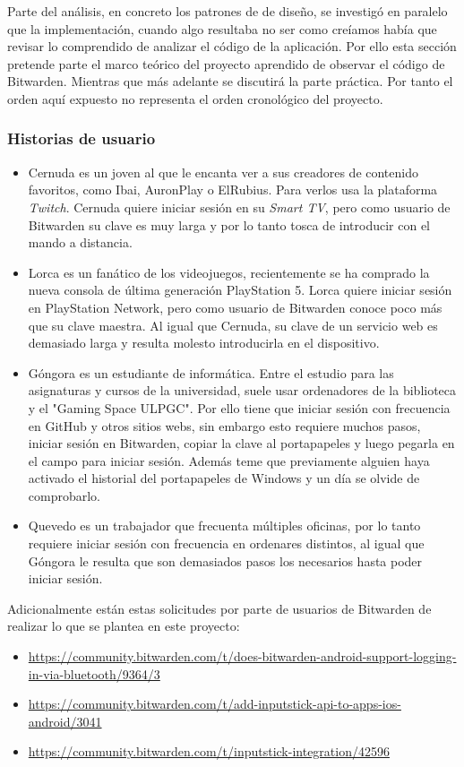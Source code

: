 Parte del análisis, en concreto los patrones de de diseño, se investigó en paralelo que la implementación, cuando algo resultaba no ser como creíamos había que revisar lo comprendido de analizar el código de la aplicación. Por ello esta sección pretende parte el marco teórico del proyecto aprendido de observar el código de Bitwarden. Mientras que más adelante se discutirá la parte práctica. Por tanto el orden aquí expuesto no representa el orden cronológico del proyecto.

\subsubsection{Historias de usuario}
\begin{itemize}
    \item Cernuda es un joven al que le encanta ver a sus creadores de contenido favoritos, como Ibai, AuronPlay o ElRubius. Para verlos usa la plataforma \textit{Twitch}. Cernuda quiere iniciar sesión en su \textit{Smart TV}, pero como usuario de Bitwarden su clave es muy larga y por lo tanto tosca de introducir con el mando a distancia.
    \item Lorca es un fanático de los videojuegos, recientemente se ha comprado la nueva consola de última generación PlayStation 5. Lorca quiere iniciar sesión en PlayStation Network, pero como usuario de Bitwarden conoce poco más que su clave maestra. Al igual que Cernuda, su clave de un servicio web es demasiado larga y resulta molesto introducirla en el dispositivo.
    \item Góngora es un estudiante de informática. Entre el estudio para las asignaturas y cursos de la universidad, suele usar ordenadores de la biblioteca y el "Gaming Space ULPGC". Por ello tiene que iniciar sesión con frecuencia en GitHub y otros sitios webs, sin embargo esto requiere muchos pasos, iniciar sesión en Bitwarden, copiar la clave al portapapeles y luego pegarla en el campo para iniciar sesión. Además teme que previamente alguien haya activado el historial del portapapeles de Windows y un día se olvide de comprobarlo.
    \item Quevedo es un trabajador que frecuenta múltiples oficinas, por lo tanto requiere iniciar sesión con frecuencia en ordenares distintos, al igual que Góngora le resulta que son demasiados pasos los necesarios hasta poder iniciar sesión.
\end{itemize}

Adicionalmente están estas solicitudes por parte de usuarios de Bitwarden de realizar lo que se plantea en este proyecto:
\begin{itemize}
    \item \url{https://community.bitwarden.com/t/does-bitwarden-android-support-logging-in-via-bluetooth/9364/3}
    \item \url{https://community.bitwarden.com/t/add-inputstick-api-to-apps-ios-android/3041}
    \item \url{https://community.bitwarden.com/t/inputstick-integration/42596}
\end{itemize}

